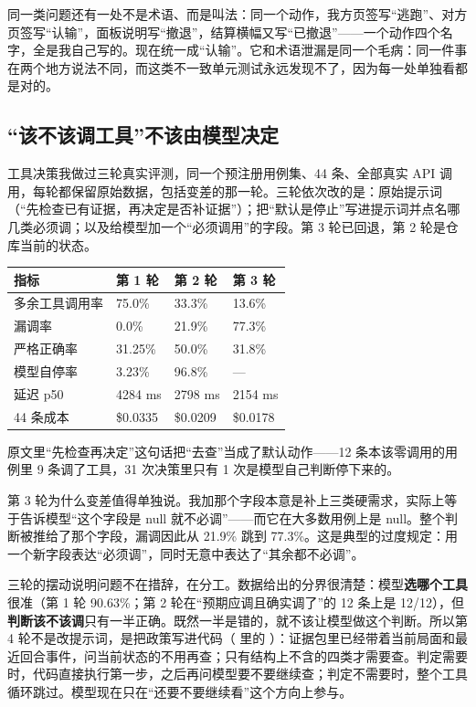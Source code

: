 同一类问题还有一处不是术语、而是叫法：同一个动作，我方页签写“逃跑”、对方页签写“认输”，面板说明写“撤退”，结算横幅又写“已撤退”——一个动作四个名字，全是我自己写的。现在统一成“认输”。它和术语泄漏是同一个毛病：同一件事在两个地方说法不同，而这类不一致单元测试永远发现不了，因为每一处单独看都是对的。

\subsection{“该不该调工具”不该由模型决定}

工具决策我做过三轮真实评测，同一个预注册用例集、44 条、全部真实 API 调用，每轮都保留原始数据，包括变差的那一轮。三轮依次改的是：原始提示词（“先检查已有证据，再决定是否补证据”）；把“默认是停止”写进提示词并点名哪几类必须调；以及给模型加一个“必须调用”的字段。第 3 轮已回退，第 2 轮是仓库当前的状态。

\begin{table}[h]
\centering
\small
\begin{tabular}{L{3.6cm}L{2.9cm}L{3.4cm}L{3.4cm}}
\toprule
指标 & 第 1 轮 & 第 2 轮 & 第 3 轮 \\
\midrule
多余工具调用率 & 75.0\% & 33.3\% & 13.6\% \\
漏调率 & 0.0\% & 21.9\% & 77.3\% \\
严格正确率 & 31.25\% & 50.0\% & 31.8\% \\
模型自停率 & 3.23\% & 96.8\% & --- \\
延迟 p50 & 4284 ms & 2798 ms & 2154 ms \\
44 条成本 & \$0.0335 & \$0.0209 & \$0.0178 \\
\bottomrule
\end{tabular}
\end{table}

原文里“先检查再决定”这句话把“去查”当成了默认动作——12 条本该零调用的用例里 9 条调了工具，31 次决策里只有 1 次是模型自己判断停下来的。

第 3 轮为什么变差值得单独说。我加那个字段本意是补上三类硬需求，实际上等于告诉模型“这个字段是 null 就不必调”——而它在大多数用例上是 null。整个判断被推给了那个字段，漏调因此从 21.9\% 跳到 77.3\%。这是典型的过度规定：用一个新字段表达“必须调”，同时无意中表达了“其余都不必调”。

三轮的摆动说明问题不在措辞，在分工。数据给出的分界很清楚：模型\textbf{选哪个工具}很准（第 1 轮 90.63\%；第 2 轮在“预期应调且确实调了”的 12 条上是 12/12），但\textbf{判断该不该调}只有一半正确。既然一半是错的，就不该让模型做这个判断。所以第 4 轮不是改提示词，是把政策写进代码（ 里的 ）：证据包里已经带着当前局面和最近回合事件，问当前状态的不用再查；只有结构上不含的四类才需要查。判定需要时，代码直接执行第一步，之后再问模型要不要继续查；判定不需要时，整个工具循环跳过。模型现在只在“还要不要继续看”这个方向上参与。

